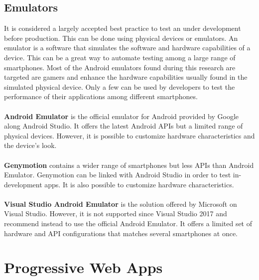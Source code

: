 \documentclass{kththesis}
\begin{document}
\subsection{Emulators}
    It is considered a largely accepted best practice to test an under development before production. This can be done using physical devices or emulators. An emulator is a software that simulates the software and hardware capabilities of a device\cite{emulator_def}. This can be a great way to automate testing among a large range of smartphones. Most of the Android emulators found during this research are targeted are gamers and enhance the hardware capabilities usually found in the simulated physical device. Only a few can be used by developers to test the performance of their applications among different smartphones.
    
\paragraph{}
\textbf{Android Emulator} \cite{android_emulator} is the official emulator for Android provided by Google along Android Studio. It offers the latest Android APIs but a limited range of physical devices. However, it is possible to customize hardware characteristics and the device's look.

\paragraph{}
\textbf{Genymotion} \cite{genymotion_emulator} contains a wider range of smartphones but less APIs than Android Emulator. Genymotion can be linked with Android Studio in order to test in-development apps. It is also possible to customize hardware characteristics.

\paragraph{}
\textbf{Visual Studio Android Emulator} \cite{microsoft_emulator} is the solution offered by Microsoft on Visual Studio. However, it is not supported since Visual Studio 2017 and recommend instead to use the official Android Emulator. It offers a limited set of hardware and API configurations that matches several smartphones at once. 

\section{Progressive Web Apps}
\end{document}
